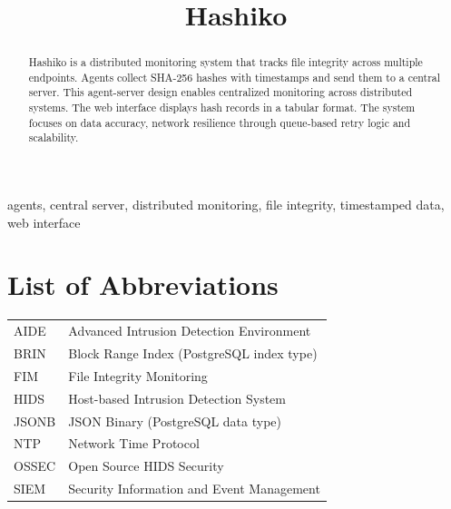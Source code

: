 \documentclass[conference]{IEEEtran}
\begin{document}
\title{Hashiko\\
}

\author{
}

\maketitle

\begin{abstract}
Hashiko is a distributed monitoring system that tracks file integrity across multiple endpoints. Agents collect SHA-256 hashes with timestamps and send them to a central server. This agent-server design enables centralized monitoring across distributed systems. The web interface displays hash records in a tabular format. The system focuses on data accuracy, network resilience through queue-based retry logic and scalability.
\end{abstract}

\begin{IEEEkeywords}
    agents, central server, distributed monitoring, file integrity, timestamped data, web interface
\end{IEEEkeywords}

\section*{List of Abbreviations}

\begin{tabularx}{\columnwidth}{@{}p{1cm}X@{}}
AIDE & Advanced Intrusion Detection Environment \\
BRIN & Block Range Index (PostgreSQL index type) \\
FIM  & File Integrity Monitoring \\
HIDS & Host-based Intrusion Detection System \\
JSONB & JSON Binary (PostgreSQL data type) \\
NTP  & Network Time Protocol \\
OSSEC & Open Source HIDS Security \\
SIEM & Security Information and Event Management \\
\end{tabularx}
\end{document}
